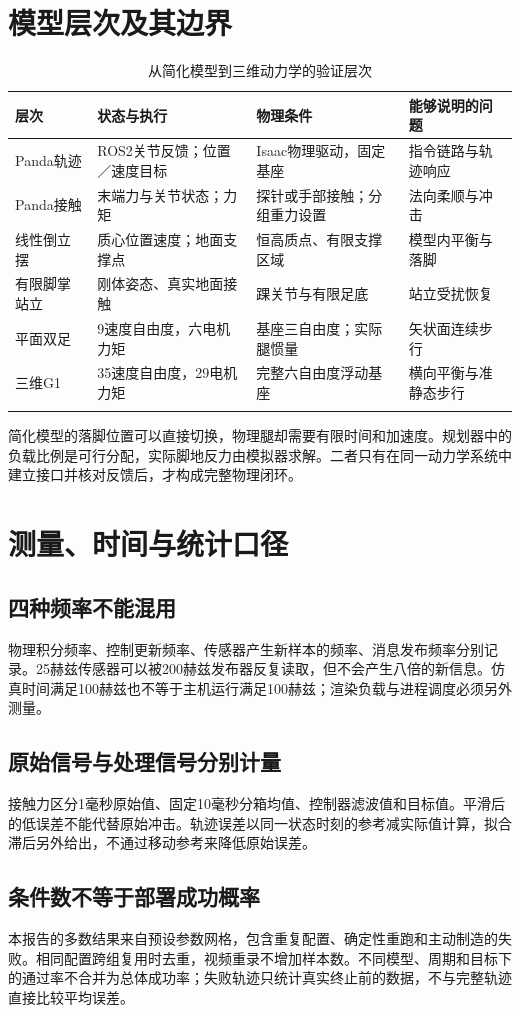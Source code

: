 \section{模型层次及其边界}
\begin{longtable}{p{.18\linewidth}p{.24\linewidth}p{.24\linewidth}p{.23\linewidth}}
\toprule 层次 & 状态与执行 & 物理条件 & 能够说明的问题\\\midrule\endhead
Panda轨迹 & ROS2关节反馈；位置／速度目标 & Isaac物理驱动，固定基座 & 指令链路与轨迹响应\\
Panda接触 & 末端力与关节状态；力矩 & 探针或手部接触；分组重力设置 & 法向柔顺与冲击\\
线性倒立摆 & 质心位置速度；地面支撑点 & 恒高质点、有限支撑区域 & 模型内平衡与落脚\\
有限脚掌站立 & 刚体姿态、真实地面接触 & 踝关节与有限足底 & 站立受扰恢复\\
平面双足 & 9速度自由度，六电机力矩 & 基座三自由度；实际腿惯量 & 矢状面连续步行\\
三维G1 & 35速度自由度，29电机力矩 & 完整六自由度浮动基座 & 横向平衡与准静态步行\\
\bottomrule\caption{从简化模型到三维动力学的验证层次}\end{longtable}

简化模型的落脚位置可以直接切换，物理腿却需要有限时间和加速度。规划器中的负载比例是可行分配，实际脚地反力由模拟器求解。二者只有在同一动力学系统中建立接口并核对反馈后，才构成完整物理闭环。
\section{测量、时间与统计口径}
\subsection{四种频率不能混用}
物理积分频率、控制更新频率、传感器产生新样本的频率、消息发布频率分别记录。25赫兹传感器可以被200赫兹发布器反复读取，但不会产生八倍的新信息。仿真时间满足100赫兹也不等于主机运行满足100赫兹；渲染负载与进程调度必须另外测量。
\subsection{原始信号与处理信号分别计量}
接触力区分1毫秒原始值、固定10毫秒分箱均值、控制器滤波值和目标值。平滑后的低误差不能代替原始冲击。轨迹误差以同一状态时刻的参考减实际值计算，拟合滞后另外给出，不通过移动参考来降低原始误差。
\subsection{条件数不等于部署成功概率}
本报告的多数结果来自预设参数网格，包含重复配置、确定性重跑和主动制造的失败。相同配置跨组复用时去重，视频重录不增加样本数。不同模型、周期和目标下的通过率不合并为总体成功率；失败轨迹只统计真实终止前的数据，不与完整轨迹直接比较平均误差。

